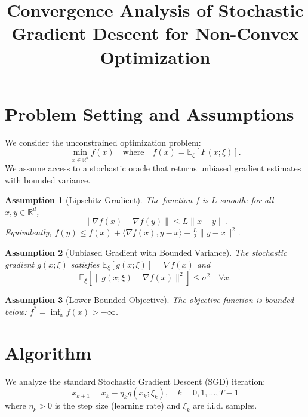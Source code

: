 \documentclass{article}
\title{Convergence Analysis of Stochastic Gradient Descent for Non-Convex Optimization}
\author{}
\date{}
\newtheorem{assumption}{Assumption}
\begin{document}
\maketitle

\section{Problem Setting and Assumptions}
We consider the unconstrained optimization problem:
\begin{equation}
    \min_{x \in \mathbb{R}^d} f(x) \quad \text{where} \quad f(x) = \mathbb{E}_{\xi}[F(x; \xi)].
\end{equation}
We assume access to a stochastic oracle that returns unbiased gradient estimates with bounded variance.

\begin{assumption}[Lipschitz Gradient] \label{assump:lipschitz}
    The function $f$ is $L$-smooth: for all $x, y \in \mathbb{R}^d$,
    \begin{equation}
        \|\nabla f(x) - \nabla f(y)\| \le L \|x - y\|.
    \end{equation}
    Equivalently, $f(y) \le f(x) + \langle \nabla f(x), y-x \rangle + \frac{L}{2}\|y-x\|^2$.
\end{assumption}

\begin{assumption}[Unbiased Gradient with Bounded Variance] \label{assump:variance}
    The stochastic gradient $g(x; \xi)$ satisfies $\mathbb{E}_{\xi}[g(x; \xi)] = \nabla f(x)$ and
    \begin{equation}
        \mathbb{E}_{\xi}[\|g(x; \xi) - \nabla f(x)\|^2] \le \sigma^2 \quad \forall x.
    \end{equation}
\end{assumption}

\begin{assumption}[Lower Bounded Objective] \label{assump:lower}
    The objective function is bounded below: $f^* = \inf_x f(x) > -\infty$.
\end{assumption}

\section{Algorithm}
We analyze the standard Stochastic Gradient Descent (SGD) iteration:
\begin{equation}
    x_{k+1} = x_k - \eta_k g(x_k; \xi_k), \quad k = 0,1,\dots,T-1
\end{equation}
where $\eta_k > 0$ is the step size (learning rate) and $\xi_k$ are i.i.d. samples.
\end{document}
